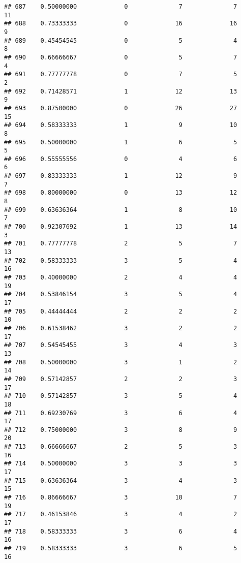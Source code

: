 \documentclass[
]{article}
\begin{document}
\begin{verbatim}
## 687    0.50000000             0              7              7             11
## 688    0.73333333             0             16             16              9
## 689    0.45454545             0              5              4              8
## 690    0.66666667             0              5              7              4
## 691    0.77777778             0              7              5              2
## 692    0.71428571             1             12             13              9
## 693    0.87500000             0             26             27             15
## 694    0.58333333             1              9             10              8
## 695    0.50000000             1              6              5              5
## 696    0.55555556             0              4              6              6
## 697    0.83333333             1             12              9              7
## 698    0.80000000             0             13             12              8
## 699    0.63636364             1              8             10              7
## 700    0.92307692             1             13             14              3
## 701    0.77777778             2              5              7             13
## 702    0.58333333             3              5              4             16
## 703    0.40000000             2              4              4             19
## 704    0.53846154             3              5              4             17
## 705    0.44444444             2              2              2             10
## 706    0.61538462             3              2              2             17
## 707    0.54545455             3              4              3             13
## 708    0.50000000             3              1              2             14
## 709    0.57142857             2              2              3             17
## 710    0.57142857             3              5              4             18
## 711    0.69230769             3              6              4             17
## 712    0.75000000             3              8              9             20
## 713    0.66666667             2              5              3             16
## 714    0.50000000             3              3              3             17
## 715    0.63636364             3              4              3             15
## 716    0.86666667             3             10              7             19
## 717    0.46153846             3              4              2             17
## 718    0.58333333             3              6              4             16
## 719    0.58333333             3              6              5             16

\end{verbatim}
\end{document}
